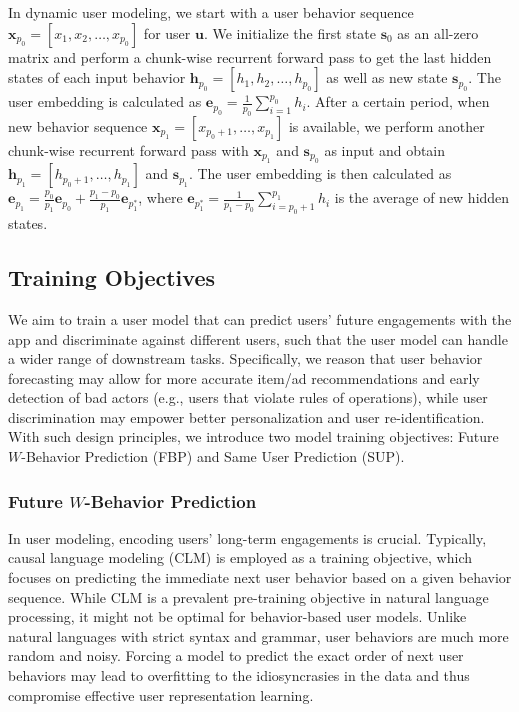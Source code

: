 \documentclass{article}
\begin{document}
In dynamic user modeling, we start with a user behavior sequence $\bm{x}_{p_0} = [x_1,x_2,\ldots,x_{p_0}]$ for user $\bm{u}$. We initialize the first state $\bm{s}_0$ as an all-zero matrix and perform a chunk-wise recurrent forward pass to get the last hidden states of each input behavior $\bm{h}_{p_0} = [h_1,h_2,\ldots,h_{p_0}]$ as well as new state $\bm{s}_{p_0}$. The user embedding is calculated as $\bm{e}_{p_0} = \frac{1}{p_0} \sum_{i=1}^{p_0} h_i$. After a certain period, when new behavior sequence $\bm{x}_{p_1} = [x_{p_0+1},\ldots,x_{p_1}]$ is available, we perform another chunk-wise recurrent forward pass with $\bm{x}_{p_1}$ and $\bm{s}_{p_0}$ as input and obtain $\bm{h}_{p_1} = [h_{p_0+1},\ldots,h_{p_1}]$ and $\bm{s}_{p_1}$. The user embedding is then calculated as $\bm{e}_{p_1} = \frac{p_0}{p_1} \bm{e}_{p_0} + \frac{p_1-p_0}{p_1} \bm{e}_{p_1^*}$, where $\bm{e}_{p_1^*} = \frac{1}{p_1 - p_0} \sum_{i={p_0}+1}^{p_1} h_i$ is the average of new hidden states.


\subsection{Training Objectives}
\label{subsec:method_objective}
We aim to train a user model that can predict users' future engagements with the app and discriminate against different users, such that the user model can handle a wider range of downstream tasks. Specifically, we reason that user behavior forecasting may allow for more accurate item/ad recommendations and early detection of bad actors (e.g., users that violate rules of operations), while user discrimination may empower better personalization and user re-identification. With such design principles, we introduce two model training objectives: Future $W$-Behavior Prediction (FBP) and Same User Prediction (SUP).

\subsubsection{Future $W$-Behavior Prediction}
In user modeling, encoding users' long-term engagements is crucial. Typically, causal language modeling (CLM) is employed as a training objective, which focuses on predicting the immediate next user behavior based on a given behavior sequence. While CLM is a prevalent pre-training objective in natural language processing, it might not be optimal for behavior-based user models. Unlike natural languages with strict syntax and grammar, user behaviors are much more random and noisy. Forcing a model to predict the exact order of next user behaviors may lead to overfitting to the idiosyncrasies in the data and thus compromise effective user representation learning.
\end{document}
